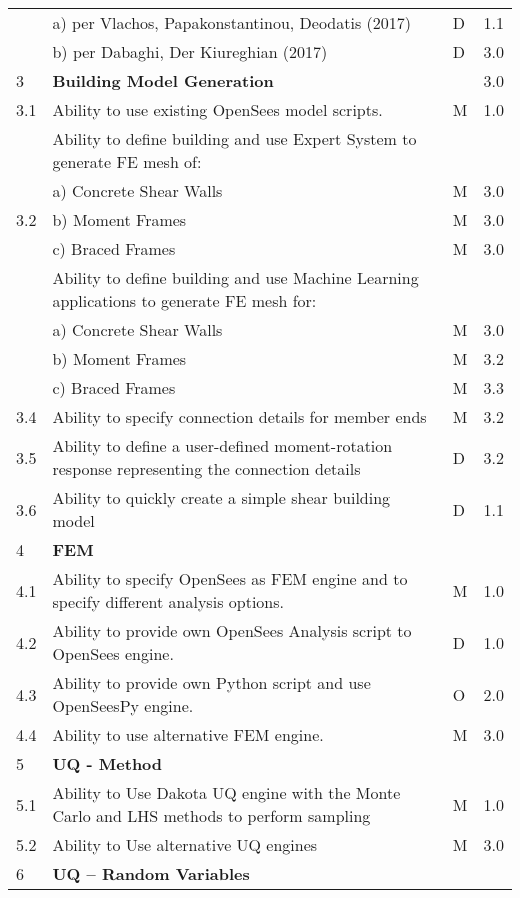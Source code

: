 {\begin{longtable}{| p{} | p{} | p{} | p{} |}
	 & a)     per Vlachos, Papakonstantinou, Deodatis (2017) & D & 1.1  \\ 
	 & b)     per Dabaghi, Der Kiureghian (2017) & D & 3.0 \\ \hline
	3 & \textbf{Building Model Generation} &  & 3.0 \\ \hline
	3.1 & Ability to use existing OpenSees model scripts. & M & 1.0 \\ \hline
	\multirow{5}{*}{3.2}  & Ability to define building and use Expert System to generate FE mesh of: &  &  \\
	 & a)     Concrete Shear Walls & M & 3.0 \\ 
	 & b)     Moment Frames & M & 3.0 \\ 
	 & c)     Braced Frames & M & 3.0  \\ \hline
	\multirow{5}{*}{3.3} & Ability to define building and use Machine Learning applications to generate FE mesh for: &  &  \\ 
	 & a)     Concrete Shear Walls & M & 3.0 \\ 
	 & b)     Moment Frames & M & 3.2 \\ 
	 & c)     Braced Frames & M & 3.3  \\ \hline
	3.4 & Ability to specify connection details for member ends & M & 3.2 \\ \hline
	3.5 & Ability to define a user-defined moment-rotation response representing the connection details & D & 3.2 \\ \hline
	3.6 & Ability to quickly create a simple shear building model & D & 1.1 \\ \hline
	4 & \textbf{FEM} &  &  \\ \hline
	4.1 & Ability to specify OpenSees as FEM engine and to specify different analysis options. & M & 1.0 \\ \hline
	4.2 & Ability to provide own OpenSees Analysis script to OpenSees engine. & D & 1.0 \\ \hline
	4.3 & Ability to provide own Python script and use OpenSeesPy engine. & O & 2.0 \\ \hline
	4.4 & Ability to use alternative FEM engine. & M & 3.0 \\ \hline
	5 & \textbf{UQ - Method} &  &  \\ \hline
	5.1 & Ability to Use Dakota UQ engine with the Monte Carlo and LHS methods to perform sampling & M & 1.0 \\ \hline
	5.2 & Ability to Use alternative UQ engines & M & 3.0 \\ \hline
    6 & \textbf{UQ – Random Variables} &  &  \\ \hline

\end{longtable}}
